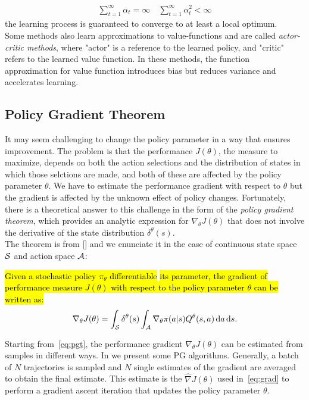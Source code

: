 \begin{align}\sum_{t=1}^{\infty}\alpha_t = \infty \quad \sum_{t=1}^{\infty}\alpha_t^2 < \infty\end{align} 
the learning process is guaranteed to converge to at least a local optimum.\\
\newline
Some methods also learn approximations to value-functions and are called \emph{actor-critic methods}, where "actor" is a reference to the learned policy, and "critic" refers to the learned value function. In these methods, the function approximation for value function introduces bias but reduces variance and accelerates learning.

\subsection{Policy Gradient Theorem} \label{subsec:pgt}
It may seem challenging to change the policy parameter in a way that ensures improvement. The problem is that the performance $J(\theta)$, \ie the measure to maximize, depends on both the action selections and the distribution of states in which those selctions are made, and both of these are affected by the policy parameter $\theta$. We have to estimate the performance gradient with respect to $\theta$ but the gradient is affected by the unknown effect of policy changes. Fortunately, there is a theoretical answer to this challenge in the form of the \emph{policy gradient theorem}, which provides an analytic expression for $\nabla_{\theta}J(\theta)$ that does not involve the derivative of the state distribution $\delta^{\theta}(s)$.\\
\newline
The theorem is from [\citet{Sutton1999PolicyGM}] and we enunciate it in the case of continuous state space $\mathcal{S}$ and action space $\mathcal{A}$:
\begin{theorem}
	\hl{Given a stochastic policy $\pi_{\theta}$ differentiable} \wrt \hl{its parameter, the gradient of performance measure $J(\theta)$ with respect to the policy parameter $\theta$ can be written as:}
	\begin{align} 
	\nabla_{\theta}J(\theta) = \int_{\mathcal{S}} \delta^{\theta}(s) \int_{\mathcal{A}} \nabla_{\theta} \pi(a|s) Q^{\theta}(s,a) \,\mathrm{d} a \,\mathrm{d} s. \label{eq:pgt}
	\end{align}
\end{theorem}
\noindent Starting from~\eqref{eq:pgt}, the performance gradient $\nabla_{\theta}J(\theta)$ can be estimated from samples in different ways. In  we present some \ac{PG} algorithms. Generally, a batch of $N$ trajectories is sampled and $N$ single estimates of the gradient are averaged to obtain the final estimate. This estimate is the $\widehat{\nabla }J(\theta)$ used in~\eqref{eq:grad} to perform a gradient ascent iteration that updates the policy parameter $\theta$.

